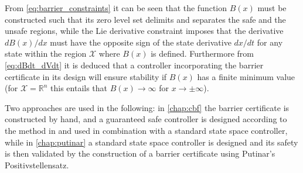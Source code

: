 From \autoref{eq:barrier_constraints} it can be seen that the function $B(x)$ must be constructed such that its zero level set delimits and separates the safe and the unsafe regions, while the Lie derivative constraint imposes that the derivative $dB(x)/dx$ must have the opposite sign of the state derivative $dx/dt$ for any state within the region $\mathcal{X}$ where $B(x)$ is defined. Furthermore from \autoref{eq:dBdt_dVdt} it is deduced that a controller incorporating the barrier certificate in its design will ensure stability if $B(x)$ has a finite minimum value (for $\mathcal{X}=\mathbb{R}^n$ this entails that $B(x)\rightarrow \infty$ for $x\rightarrow \pm\infty$).

Two approaches are used in the following: in \autoref{chap:cbf} the barrier certificate is constructed by hand, and a guaranteed safe controller is designed according to the method in \citep{bib:org_control} and used in combination with a standard state space controller, while in \autoref{chap:putinar} a standard state space controller is designed and its safety is then validated by the construction of a barrier certificate using Putinar's Positivstellensatz.










